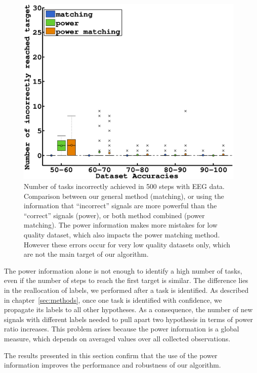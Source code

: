 \begin{figure}[!htbp]
\centering
\includegraphics[width=\columnwidth]{figures/power/error.eps}
\caption{Number of tasks incorrectly achieved in 500 steps with EEG data. Comparison between our general method (matching), or using the information that ``incorrect'' signals are more powerful than the ``correct'' signals (power), or both method combined (power matching). The power information makes more mistakes for low quality dataset, which also impacts the power matching method. However these errors occur for very low quality datasets only, which are not the main target of our algorithm.}
\label{fig:nWrongEEG_powermatching}
\end{figure}

The power information alone is not enough to identify a high number of tasks, even if the number of steps to reach the first target is similar. The difference lies in the reallocation of labels, we performed after a task is identified. As described in chapter~\ref{sec:methods}, once one task is identified with confidence, we propagate its labels to all other hypotheses. As a consequence, the number of new signals with different labels needed to pull apart two hypothesis in terms of power ratio increases. This problem arises because the power information is a global measure, which depends on averaged values over all collected observations.

The results presented in this section confirm that the use of the power information improves the performance and robustness of our algorithm.
